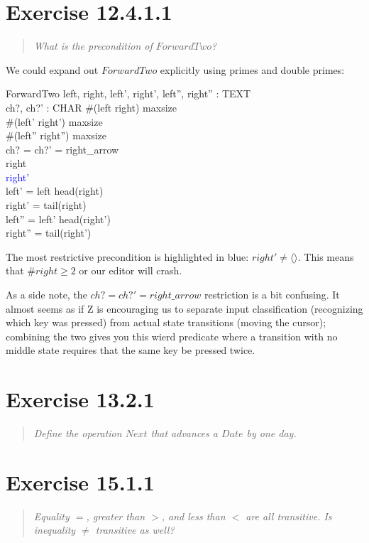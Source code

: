 \documentclass[10pt]{article}
\begin{document}
\section{Exercise 12.4.1.1}
\begin{quote}
  {\it
   What is the precondition of $ForwardTwo$? 
  }
\end{quote}

We could expand out $ForwardTwo$ explicitly using primes and double primes:

\begin{schema}{ForwardTwo}
  left, right, left', right', left'', right'' : TEXT \\
  ch?, ch?' : CHAR
  \where
  \#(left \cat right) \leq maxsize\\
  \#(left' \cat right') \leq maxsize\\
  \#(left'' \cat right'') \leq maxsize\\
  ch? = ch?' = right\_arrow \\
  right \neq \langle \rangle \\
  \textcolor{blue}{right' \neq \langle \rangle} \\
  left' = left \cat \langle head(right)\rangle \\
  right' = tail(right) \\
  left'' = left' \cat \langle head(right')\rangle \\
  right'' = tail(right') \\
\end{schema}

The most restrictive precondition is highlighted in blue: $right' \neq \langle \rangle$.  This means
that $\#right \geq 2$ or our editor will crash.

As a side note, the $ch? = ch?' = right\_arrow$ restriction is a bit confusing.  It almost seems as
if Z is encouraging us to separate input classification (recognizing which key was pressed) from
actual state transitions (moving the cursor); combining the two gives you this wierd predicate where
a transition with no middle state requires that the same key be pressed twice.

\tocheck



\section{Exercise 13.2.1}
\begin{quote}
  {\it
    Define the operation $Next$ that advances a $Date$ by one day.
  }
\end{quote}
\tostart



\section{Exercise 15.1.1}
\begin{quote}
  {\it
    Equality $=$, greater than $>$, and less than $<$ are all transitive. Is inequality $\neq$
    transitive as well?
  }
\end{quote}
\tostart
\end{document}
